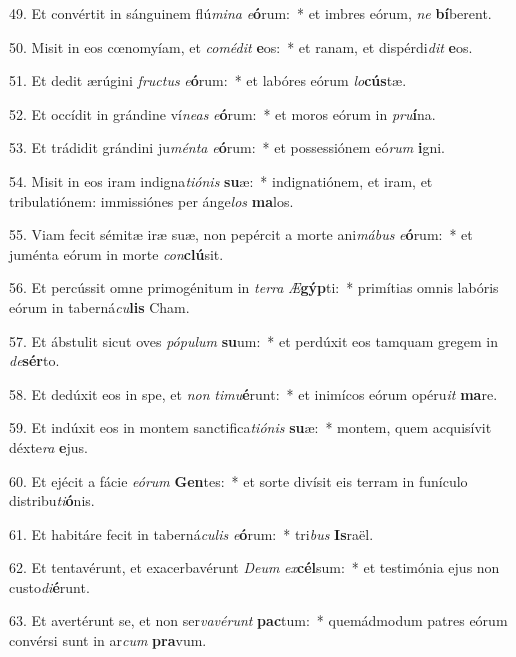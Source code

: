 49. Et convértit in sánguinem flú\textit{mi}\textit{na} \textit{e}\textbf{ó}rum:~*  et imbres eórum, \textit{ne} \textbf{bí}berent.\

50. Misit in eos cœnomyíam, et \textit{com}\textit{é}\textit{dit} \textbf{e}os:~*  et ranam, et dispérdi\textit{dit} \textbf{e}os.\

51. Et dedit ærúgini \textit{fruc}\textit{tus} \textit{e}\textbf{ó}rum:~*  et labóres eórum \textit{lo}\textbf{cús}tæ.\

52. Et occídit in grándine ví\textit{ne}\textit{as} \textit{e}\textbf{ó}rum:~*  et moros eórum in \textit{pru}\textbf{í}na.\

53. Et trádidit grándini ju\textit{mén}\textit{ta} \textit{e}\textbf{ó}rum:~*  et possessiónem eó\textit{rum} \textbf{i}gni.\

54. Misit in eos iram indigna\textit{ti}\textit{ó}\textit{nis} \textbf{su}æ:~*  indignatiónem, et iram, et tribulatiónem: immissiónes per ánge\textit{los} \textbf{ma}los.\

55. Viam fecit sémitæ iræ suæ, non pepércit a morte ani\textit{má}\textit{bus} \textit{e}\textbf{ó}rum:~*  et juménta eórum in morte \textit{con}\textbf{clú}sit.\

56. Et percússit omne primogénitum in \textit{ter}\textit{ra} \textit{Æ}\textbf{gýp}ti:~*  primítias omnis labóris eórum in taberná\textit{cu}\textbf{lis} Cham.\

57. Et ábstulit sicut oves \textit{pó}\textit{pu}\textit{lum} \textbf{su}um:~*  et perdúxit eos tamquam gregem in \textit{de}\textbf{sér}to.\

58. Et dedúxit eos in spe, et \textit{non} \textit{ti}\textit{mu}\textbf{é}runt:~*  et inimícos eórum opéru\textit{it} \textbf{ma}re.\

59. Et indúxit eos in montem sanctifica\textit{ti}\textit{ó}\textit{nis} \textbf{su}æ:~*  montem, quem acquisívit déxte\textit{ra} \textbf{e}jus.\

60. Et ejécit a fácie \textit{e}\textit{ó}\textit{rum} \textbf{Gen}tes:~*  et sorte divísit eis terram in funículo distribu\textit{ti}\textbf{ó}nis.\

61. Et habitáre fecit in taberná\textit{cu}\textit{lis} \textit{e}\textbf{ó}rum:~*  tri\textit{bus} \textbf{Is}raël.\

62. Et tentavérunt, et exacerbavérunt \textit{De}\textit{um} \textit{ex}\textbf{cél}sum:~*  et testimónia ejus non custo\textit{di}\textbf{é}runt.\

63. Et avertérunt se, et non ser\textit{va}\textit{vé}\textit{runt} \textbf{pac}tum:~*  quemádmodum patres eórum convérsi sunt in ar\textit{cum} \textbf{pra}vum.\

